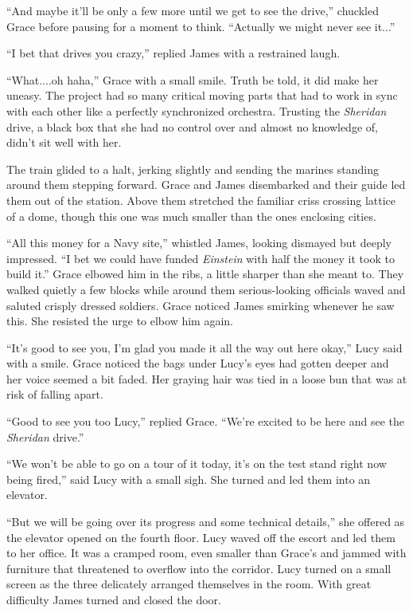 \documentclass[12pt]{article} %
\begin{document}
``And maybe it'll be only a few more until we get to see the drive,'' chuckled Grace before pausing for a moment to think. ``Actually we might never see it...''

``I bet that drives you crazy,'' replied James with a restrained laugh.

``What....oh haha,'' Grace with a small smile. Truth be told, it did make her uneasy. The project had so many critical moving parts that had to work in sync with each other like a perfectly synchronized orchestra. Trusting the \textit{Sheridan} drive, a black box that she had no control over and almost no knowledge of, didn't sit well with her. 

The train glided to a halt, jerking slightly and sending the marines standing around them stepping forward. Grace and James disembarked and their guide led them out of the station. Above them stretched the familiar criss crossing lattice of a dome, though this one was much smaller than the ones enclosing cities. 

``All this money for a Navy site,'' whistled James, looking dismayed but deeply impressed. ``I bet we could have funded \textit{Einstein} with half the money it took to build it.'' Grace elbowed him in the ribs, a little sharper than she meant to. They walked quietly a few blocks while around them serious-looking officials waved and saluted crisply dressed soldiers. Grace noticed James smirking whenever he saw this. She resisted the urge to elbow him again.

``It's good to see you, I'm glad you made it all the way out here okay,'' Lucy said with a smile. Grace noticed the bags under Lucy's eyes had gotten deeper and her voice seemed a bit faded. Her graying hair was tied in a loose bun that was at risk of falling apart.

``Good to see you too Lucy,'' replied Grace. ``We're excited to be here and see the \textit{Sheridan} drive.''

``We won't be able to go on a tour of it today, it's on the test stand right now being fired,'' said Lucy with a small sigh. She turned and led them into an elevator.

``But we will be going over its progress and some technical details,'' she offered as the elevator opened on the fourth floor. Lucy waved off the escort and led them to her office. It was a cramped room, even smaller than Grace's and jammed with furniture that threatened to overflow into the corridor. Lucy turned on a small screen as the three delicately arranged themselves in the room. With great difficulty James turned and closed the door.
\end{document}
